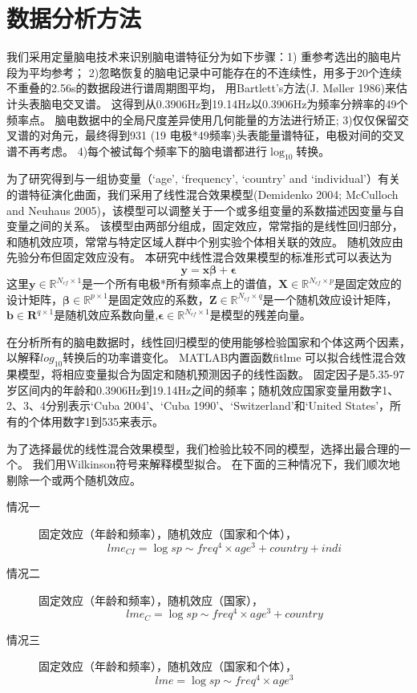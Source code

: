 \section{数据分析方法}\label{ch:lme}
我们采用定量脑电技术来识别脑电谱特征分为如下步骤：1) 重参考选出的脑电片段为平均参考； 2)忽略恢复的脑电记录中可能存在的不连续性，用多于20个连续不重叠的2.56s的数据段进行谱周期图平均， 用Bartlett’s方法\citing{}(J. Møller 1986)来估计头表脑电交叉谱。 这得到从0.3906Hz到19.14Hz以0.3906Hz为频率分辨率的49个频率点。 脑电数据中的全局尺度差异使用几何能量的方法进行矫正; 3)仅仅保留交叉谱的对角元，最终得到931 (19 电极*49频率)头表能量谱特征，电极对间的交叉谱不再考虑。 4)每个被试每个频率下的脑电谱都进行$\log_{10}$转换。

为了研究得到与一组协变量（‘age’, ‘frequency’, ‘country’ and ‘individual’）有关的谱特征演化曲面，我们采用了线性混合效果模型\citing{}(Demidenko 2004; McCulloch and Neuhaus 2005)，该模型可以调整关于一个或多组变量的系数描述因变量与自变量之间的关系。 该模型由两部分组成，固定效应，常常指的是线性回归部分，和随机效应项，常常与特定区域人群中个别实验个体相关联的效应。 随机效应由先验分布但固定效应没有。 本研究中线性混合效果模型的标准形式可以表达为
\begin{equation*}
\mathbf{y=x\beta+\epsilon}
\end{equation*}
这里$\mathbf{y}\in{\mathbb{R}^{N_{cf}\times{1}}}$是一个所有电极*所有频率点上的谱值，$\mathbf{X}\in{\mathbb{R}^{N_{cf}\times{p}}}$是固定效应的设计矩阵，$\mathbf{\beta}\in{\mathbb{R}^{p\times{1}}}$是固定效应的系数，$\mathbf{Z}\in{\mathbb{R}^{N_{cf}\times{q}}}$是一个随机效应设计矩阵，$\mathbf{b}\in{\mathbf{R}^{q\times{1}}}$是随机效应系数向量,$\mathbf{\epsilon}\in{\mathbb{R}^{N_{cf}\times{1}}}$是模型的残差向量。

在分析所有的脑电数据时，线性回归模型的使用能够检验国家和个体这两个因素，以解释$log_{10}$转换后的功率谱变化。 MATLAB内置函数fitlme 可以拟合线性混合效果模型，将相应变量拟合为固定和随机预测因子的线性函数。 固定因子是5.35-97岁区间内的年龄和0.3906Hz到19.14Hz之间的频率；随机效应国家变量用数字1、2、3、4分别表示‘Cuba 2004’、‘Cuba 1990’、‘Switzerland’和‘United States’，所有的个体用数字1到535来表示。

为了选择最优的线性混合效果模型，我们检验比较不同的模型，选择出最合理的一个。 我们用Wilkinson符号来解释模型拟合。 在下面的三种情况下，我们顺次地剔除一个或两个随机效应。
\begin{description}
	\item[情况一] 固定效应（年龄和频率），随机效应（国家和个体），\[lme_{CI}=\log{sp}\sim{freq^4\times{age^3}+country+indi}\]
	\item[情况二] 固定效应（年龄和频率），随机效应（国家），\[lme_{C}=\log{sp}\sim{freq^4\times{age^3}+country}\]
	\item[情况三] 固定效应（年龄和频率），随机效应（国家和个体），\[lme=\log{sp}\sim{freq^4\times{age^3}}\]
\end{description}

